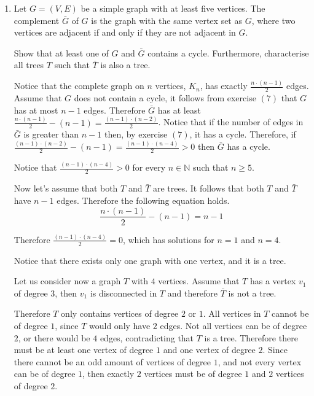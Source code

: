 \begin{enumerate}
\begin{enumerate}
    \end{enumerate}
    \pagebreak
    
    \item Let $G=(V,E)$ be a simple graph with at least five vertices. The complement $\bar G$ of $G$ is the graph with the same vertex set as $G$, where two vertices are adjacent if and only if they are not adjacent in $G$.
    
    Show that at least one of $G$ and $\bar G$ contains a cycle. Furthermore, characterise all trees $T$ such that $\bar T$ is also a tree.
    
    \vspace{1em}
    
    Notice that the complete graph on $n$ vertices, $K_n$, has exactly $\frac{n \cdot (n-1)}{2}$ edges. Assume that $G$ does not contain a cycle, it follows from exercise $(7) $ that $G$ has at most $n-1$ edges. Therefore $\bar G$ has at least $\frac{n \cdot (n-1)}{2}- (n-1) = \frac{(n-1)\cdot (n-2)}{2}$. Notice that if the number of edges in $\bar G$ is greater than $n-1$ then, by exercise $(7)$, it has a cycle. Therefore, if $\frac{(n-1)\cdot (n-2)}{2}-(n-1) = \frac{(n-1) \cdot (n-4)}{2} > 0$ then $\bar G$ has a cycle.
    
    Notice that $\frac{(n-1) \cdot (n-4)}{2} > 0$ for every $n\in \mathbb{N}$ such that $n \geq 5$.
    
    Now let's assume that both $T$ and $\bar T$ are trees. It follows that both $T$ and $\bar T$ have $n-1$ edges. Therefore the following equation holds. $$\frac{n\cdot (n-1)}{2}- (n-1) = n-1 $$
    
    Therefore $\frac{(n-1) \cdot (n-4)}{2} = 0$, which has solutions for $n = 1$ and $n=4$.
    
    Notice that there exists only one graph with one vertex, and it is a tree.
    
    Let us consider now a graph $T$ with $4$ vertices. Assume that $T$  has a vertex $v_1$ of degree $3$, then $v_1$ is disconnected in $T$ and therefore $\bar T$ is not a tree.
    
    Therefore $T$ only contains vertices of degree $2$ or $1$. All vertices in $T$ cannot be of degree $1$, since $T$ would only have $2$ edges. Not all vertices can be of degree $2$, or there would be $4$ edges, contradicting that $T$ is a tree. Therefore there must be at least one vertex of degree $1$ and one vertex of degree $2$. Since there cannot be an odd amount of vertices of degree $1$, and not every vertex can be of degree $1$, then exactly $2$ vertices must be of degree $1$ and $2$ vertices of degree $2$. 
    

\end{enumerate}
